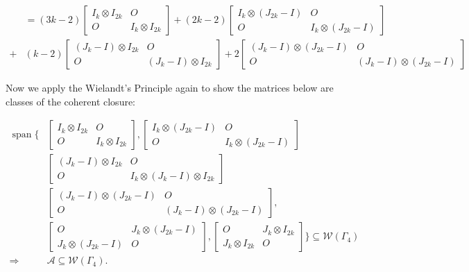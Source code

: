 \begin{align*}
    &= (3k-2)\begin{bmatrix}
        I_k\otimes I_{2k} & O\\
        O & I_k\otimes I_{2k}
    \end{bmatrix} + (2k-2)\begin{bmatrix}
        I_k\otimes (J_{2k}-I) & O\\
        O & I_k\otimes (J_{2k}-I)
    \end{bmatrix}\\
    +& (k-2)\begin{bmatrix}
        (J_k-I)\otimes I_{2k} & O\\
        O & (J_k-I)\otimes I_{2k}
    \end{bmatrix} + 2\begin{bmatrix}
        (J_k-I)\otimes(J_{2k}-I) & O\\
        O & (J_k-I)\otimes(J_{2k}-I)
    \end{bmatrix}
\end{align*}

Now we apply the Wielandt's Principle again to show the matrices below are classes of the coherent closure:

\begin{align*}
    \operatorname{span}\{
    &\begin{bmatrix}
        I_k\otimes I_{2k} & O\\
        O & I_k\otimes I_{2k}
    \end{bmatrix},
    \begin{bmatrix}
        I_k\otimes (J_{2k}-I) & O\\
        O & I_k\otimes (J_{2k}-I)
    \end{bmatrix}\\
    &\begin{bmatrix}
        (J_k-I)\otimes I_{2k} & O\\
        O & I_k\otimes (J_k-I)\otimes I_{2k}
    \end{bmatrix}\\
    &\begin{bmatrix}
        (J_k-I)\otimes(J_{2k}-I) & O\\
        O & (J_k-I)\otimes(J_{2k}-I)
    \end{bmatrix},\\
    &\begin{bmatrix}
        O & J_k\otimes (J_{2k}-I)\\
        J_k\otimes (J_{2k}-I) & O
    \end{bmatrix},
    \begin{bmatrix}
        O & J_k\otimes I_{2k}\\
        J_k\otimes I_{2k} & O
    \end{bmatrix}
    \}\subseteq\mathcal{W}(\Gamma_4)\\
    \Rightarrow &\mathcal{A}\subseteq\mathcal{W}(\Gamma_4).
\end{align*}

